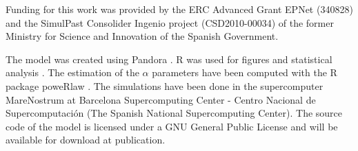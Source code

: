 \documentclass{wscpaperproc}
\begin{document}
Funding for this work was provided by the ERC Advanced Grant EPNet (340828) and the SimulPast Consolider Ingenio project (CSD2010-00034) of the former Ministry for Science and Innovation of the Spanish Government. 

The model was created using Pandora \cite{rubiocampillo_2014}. R was used for figures and statistical analysis \cite{rdev_2012}. The estimation of the $\alpha$ parameters have been computed with the R package poweRlaw \cite{gillespie_fitting_2015}. The simulations have been done in the supercomputer MareNostrum at Barcelona Supercomputing Center - Centro Nacional de Supercomputación (The Spanish National Supercomputing Center). The source code of the model is licensed under a GNU General Public License and will be available for download at publication.


  
\end{document}
